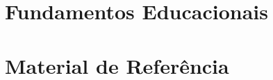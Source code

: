 \documentclass[
	11pt, %
	fleqn, %
	a4paper, %
]{LegrandOrangeBook}
\begin{document}

 



\pagestyle{empty} %

\tableofcontents %



\pagestyle{fancy} %

\cleardoublepage %


\part{Fundamentos Educacionais}


\chapterspaceabove{6.75cm} %
\chapterspacebelow{7.25cm} %





\part{Material de Referência}




%
\end{document}
